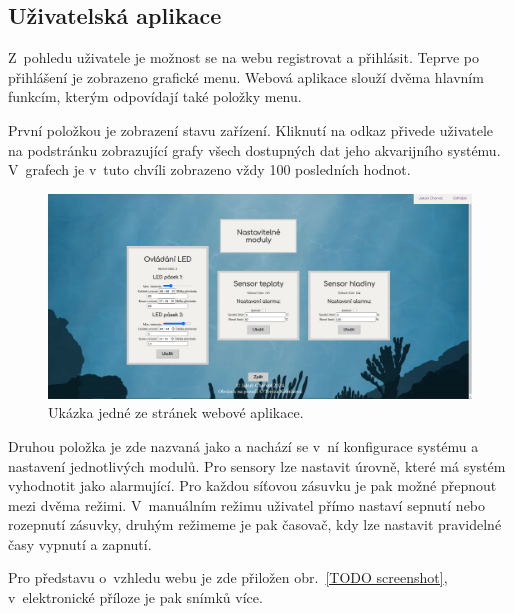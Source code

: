     \subsection{Uživatelská aplikace}
        Z~pohledu uživatele je možnost se na webu registrovat a přihlásit. Teprve po přihlášení je zobrazeno grafické menu. Webová aplikace slouží dvěma hlavním funkcím, kterým odpovídají také položky menu. 
        
        První položkou je zobrazení stavu zařízení. Kliknutí na odkaz přivede uživatele na podstránku zobrazující grafy všech dostupných dat jeho akvarijního systému. V~grafech je v~tuto chvíli zobrazeno vždy 100 posledních hodnot. 

        \begin{figure}[h!]
            \centering
            \includegraphics[width=\textwidth]{obrazky/web.png}
            \caption{Ukázka jedné ze stránek webové aplikace.}
            \label{fig:obrazky-web.png}
        \end{figure}
        

        Druhou položka je zde nazvaná jako  a nachází se v~ní konfigurace systému a nastavení jednotlivých modulů. Pro sensory lze nastavit úrovně, které má systém vyhodnotit jako alarmující. Pro každou síťovou zásuvku je pak možné přepnout mezi dvěma režimi. V~manuálním režimu uživatel přímo nastaví sepnutí nebo rozepnutí zásuvky, druhým režimeme je pak časovač, kdy lze nastavit pravidelné časy vypnutí a zapnutí.

        Pro představu o~vzhledu webu je zde přiložen obr.~\ref{TODO screenshot}, v~elektronické příloze je pak snímků více.